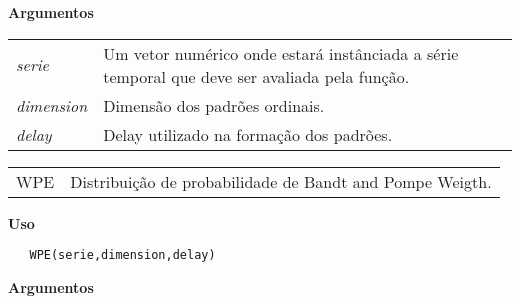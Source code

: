 \textbf{Argumentos}

\begin{table}[!ht]
\begin{center}
\begin{tabularx}{\textwidth}{X X}
\hspace{0.5cm} \textit{serie} \vspace{0.5cm}& Um vetor numérico onde estará instânciada a série temporal que deve ser avaliada pela função.\vspace{0.5cm}\\
\hspace{0.5cm} \textit{dimension} \vspace{0.5cm}& Dimensão dos padrões ordinais.\vspace{0.5cm}\\
\hspace{0.5cm} \textit{delay} & Delay utilizado na formação dos padrões.\\
\end{tabularx}
\end{center}
\end{table} 

\newpage


\hrulefill   

\begin{table}[!ht]
\begin{center}
\begin{tabularx}{\textwidth}{X X}
\hspace{0.5cm} WPE & Distribuição de probabilidade de Bandt and Pompe Weigth.\\
\end{tabularx}
\end{center}
\end{table} 

\vspace{-0.5cm}

\hrulefill  

\vspace{0.5cm}

\textbf{Uso}

\begin{lstlisting}
   WPE(serie,dimension,delay)
\end{lstlisting}

\vspace{0.5cm}


\textbf{Argumentos}

